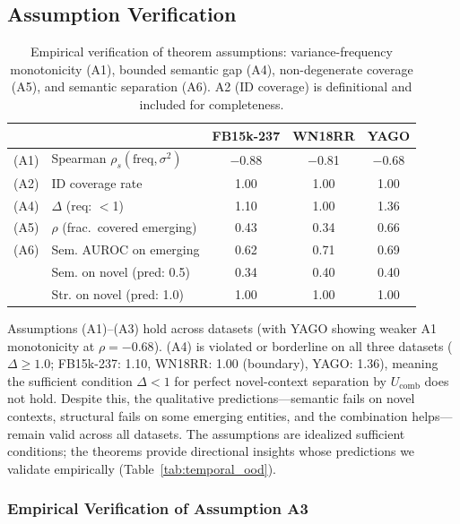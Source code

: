 \documentclass{article}
\begin{document}
\subsection{Assumption Verification}
\label{app:assumptions}

\begin{table}[ht]
\centering
\caption{Empirical verification of theorem assumptions: variance-frequency monotonicity (A1), bounded semantic gap (A4), non-degenerate coverage (A5), and semantic separation (A6). A2 (ID coverage) is definitional and included for completeness.}
\label{tab:assumptions}
\small
\begin{tabular}{llccc}
\toprule
 & & FB15k-237 & WN18RR & YAGO \\
\midrule
(A1) & Spearman $\rho_s(\text{freq}, \sigma^2)$ & $-$0.88 & $-$0.81 & $-$0.68 \\
(A2) & ID coverage rate & 1.00 & 1.00 & 1.00 \\
(A4) & $\Delta$ (req: $<$1) & 1.10 & 1.00 & 1.36 \\
(A5) & $\rho$ (frac.\ covered emerging) & 0.43 & 0.34 & 0.66 \\
(A6) & Sem. AUROC on emerging & 0.62 & 0.71 & 0.69 \\
\midrule
& Sem. on novel (pred: 0.5) & 0.34 & 0.40 & 0.40 \\
& Str. on novel (pred: 1.0) & 1.00 & 1.00 & 1.00 \\
\bottomrule
\end{tabular}
\end{table}

Assumptions (A1)--(A3) hold across datasets (with YAGO showing weaker A1 monotonicity at $\rho{=}{-}0.68$). (A4) is violated or borderline on all three datasets ($\Delta \geq 1.0$; FB15k-237: 1.10, WN18RR: 1.00 (boundary), YAGO: 1.36), meaning the sufficient condition $\Delta < 1$ for perfect novel-context separation by $U_{\text{comb}}$ does not hold. Despite this, the qualitative predictions---semantic fails on novel contexts, structural fails on some emerging entities, and the combination helps---remain valid across all datasets. The assumptions are idealized sufficient conditions; the theorems provide directional insights whose predictions we validate empirically (Table~\ref{tab:temporal_ood}).

\subsubsection{Empirical Verification of Assumption A3}
\label{app:assumption_verification}
\end{document}
